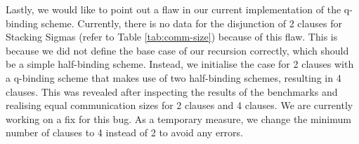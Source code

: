 Lastly, we would like to point out a flaw in our current implementation of the q-binding scheme. Currently, there is no data for the disjunction of 2 clauses for Stacking Sigmas (refer to Table \ref{tab:comm-size}) because of this flaw. This is because we did not define the base case of our recursion correctly, which should be 
a simple half-binding scheme. Instead, we initialise the case for 2 clauses with a q-binding scheme 
that makes use of two half-binding schemes, resulting in 4 clauses. This was revealed after inspecting the results of the benchmarks and realising equal communication sizes for 2 clauses and 4 clauses. We are currently working on a fix for this bug. As a temporary measure, we change the minimum number of clauses to 4 instead of 2 to avoid any errors.